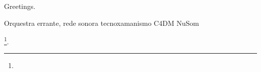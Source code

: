 
\begin{agradecimentos}

\lang
{
    Greetings.
}
{
    Orquestra errante, 
    rede sonora
    tecnoxamanismo
    C4DM
    NuSom
    
    \footnote{}.
}

\end{agradecimentos}


%
%
%
